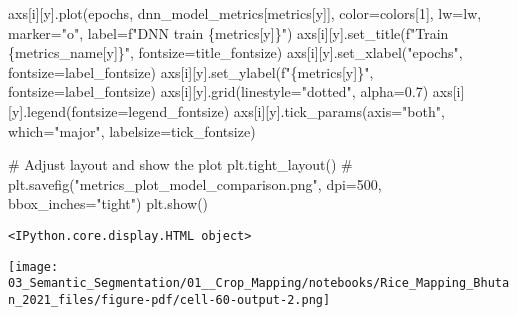\documentclass[
  letterpaper,
  DIV=11,
  numbers=noendperiod]{scrreprt}
\newenvironment{Shaded}{\begin{snugshade}}{\end{snugshade}}
\newcommand{\CommentTok}[1]{\textcolor[rgb]{0.37,0.37,0.37}{#1}}
\newcommand{\DecValTok}[1]{\textcolor[rgb]{0.68,0.00,0.00}{#1}}
\newcommand{\FloatTok}[1]{\textcolor[rgb]{0.68,0.00,0.00}{#1}}
\newcommand{\NormalTok}[1]{\textcolor[rgb]{0.00,0.23,0.31}{#1}}
\newcommand{\OperatorTok}[1]{\textcolor[rgb]{0.37,0.37,0.37}{#1}}
\newcommand{\SpecialCharTok}[1]{\textcolor[rgb]{0.37,0.37,0.37}{#1}}
\newcommand{\SpecialStringTok}[1]{\textcolor[rgb]{0.13,0.47,0.30}{#1}}
\newcommand{\StringTok}[1]{\textcolor[rgb]{0.13,0.47,0.30}{#1}}
\begin{document}
\begin{Shaded}
\begin{Highlighting}[]
\NormalTok{            axs[i][y].plot(epochs, dnn\_model\_metrics[metrics[y]], color}\OperatorTok{=}\NormalTok{colors[}\DecValTok{1}\NormalTok{], lw}\OperatorTok{=}\NormalTok{lw, marker}\OperatorTok{=}\StringTok{"o"}\NormalTok{, label}\OperatorTok{=}\SpecialStringTok{f"DNN train }\SpecialCharTok{\{}\NormalTok{metrics[y]}\SpecialCharTok{\}}\SpecialStringTok{"}\NormalTok{)}
\NormalTok{            axs[i][y].set\_title(}\SpecialStringTok{f"Train }\SpecialCharTok{\{}\NormalTok{metrics\_name[y]}\SpecialCharTok{\}}\SpecialStringTok{"}\NormalTok{, fontsize}\OperatorTok{=}\NormalTok{title\_fontsize)}
\NormalTok{            axs[i][y].set\_xlabel(}\StringTok{"epochs"}\NormalTok{, fontsize}\OperatorTok{=}\NormalTok{label\_fontsize)}
\NormalTok{            axs[i][y].set\_ylabel(}\SpecialStringTok{f"}\SpecialCharTok{\{}\NormalTok{metrics[y]}\SpecialCharTok{\}}\SpecialStringTok{"}\NormalTok{, fontsize}\OperatorTok{=}\NormalTok{label\_fontsize)}
\NormalTok{            axs[i][y].grid(linestyle}\OperatorTok{=}\StringTok{"dotted"}\NormalTok{, alpha}\OperatorTok{=}\FloatTok{0.7}\NormalTok{)}
\NormalTok{            axs[i][y].legend(fontsize}\OperatorTok{=}\NormalTok{legend\_fontsize)}
\NormalTok{            axs[i][y].tick\_params(axis}\OperatorTok{=}\StringTok{"both"}\NormalTok{, which}\OperatorTok{=}\StringTok{"major"}\NormalTok{, labelsize}\OperatorTok{=}\NormalTok{tick\_fontsize)}


\CommentTok{\# Adjust layout and show the plot}
\NormalTok{plt.tight\_layout()}
\CommentTok{\# plt.savefig("metrics\_plot\_model\_comparison.png", dpi=500, bbox\_inches="tight")}
\NormalTok{plt.show()}
\end{Highlighting}
\end{Shaded}

\begin{verbatim}
<IPython.core.display.HTML object>
\end{verbatim}

\texttt{[image: 03\_Semantic\_Segmentation/01\_\_Crop\_Mapping/notebooks/Rice\_Mapping\_Bhutan\_2021\_files/figure-pdf/cell-60-output-2.png]}
\end{document}
